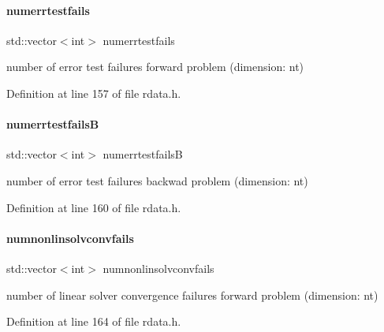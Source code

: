 \mbox{\label{classamici_1_1_return_data_aea0bfe23fb5971a5348a3d017a859488}} 
\paragraph{\texorpdfstring{numerrtestfails}{numerrtestfails}}
{\footnotesize\ttfamily std\+::vector$<$int$>$ numerrtestfails}

number of error test failures forward problem (dimension\+: nt) 

Definition at line 157 of file rdata.\+h.

\mbox{\label{classamici_1_1_return_data_a894f4cf4dbdd38dda12c5730fb04482d}} 
\paragraph{\texorpdfstring{numerrtestfailsB}{numerrtestfailsB}}
{\footnotesize\ttfamily std\+::vector$<$int$>$ numerrtestfailsB}

number of error test failures backwad problem (dimension\+: nt) 

Definition at line 160 of file rdata.\+h.

\mbox{\label{classamici_1_1_return_data_a67818adc34db21fb3d78731c0e60462a}} 
\paragraph{\texorpdfstring{numnonlinsolvconvfails}{numnonlinsolvconvfails}}
{\footnotesize\ttfamily std\+::vector$<$int$>$ numnonlinsolvconvfails}

number of linear solver convergence failures forward problem (dimension\+: nt) 

Definition at line 164 of file rdata.\+h.

